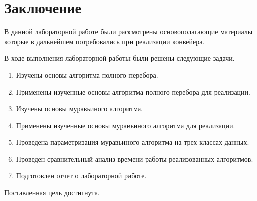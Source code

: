 \chapter*{Заключение}

В данной лабораторной работе были рассмотрены основополагающие материалы которые в дальнейшем потребовались при реализации конвейера. 


В ходе выполнения лабораторной работы были решены следующие задачи.

\begin{enumerate}
	\item Изучены основы алгоритма полного перебора.
	\item Применены изученные основы алгоритма полного перебора для реализации.
	\item Изучены основы муравьиного алгоритма.
	\item Применены изученные основы муравьиного алгоритма для реализации.
	\item Проведена параметризация муравьиного алгоритма на трех классах данных.
	\item Проведен сравнительный анализ времени работы реализованных
	алгоритмов.
	\item Подготовлен отчет о лабораторной работе.
\end{enumerate}

Поставленная цель достигнута.

